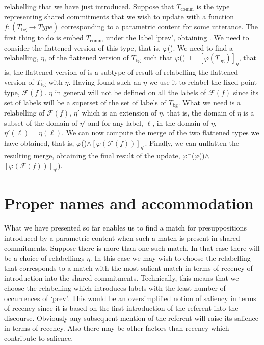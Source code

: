 relabelling that we have just introduced.  Suppose that $T_{\mathrm{comm}}$ is the
type representing shared commitments that we wish to update with a
function $f:(T_{\mathrm{bg}}\rightarrow\textit{Type})$ corresponding
to a parametric content for some utterance.  The
first thing to do is embed  $T_{\mathrm{comm}}$ under the label `prev', obtaining
.  We need to
consider the flattened version of this type, that is,
$\varphi$(). We
need to find a relabelling, $\eta$, of the flattened version of
$T_{\mathrm{bg}}$ such that
$\varphi$()
$\sqsubseteq$ $[\varphi(T_{\mathrm{bg}})]_\eta$, that is, the
flattened version of
 is a subtype of
result of relabelling the flattened version of $T_{\mathrm{bg}}$ with
$\eta$.  Having found such an $\eta$ we use it to relabel the fixed
point type, $\mathcal{F}(f)$.  $\eta$ in general will not be defined
on all the labels of $\mathcal{F}(f)$ since its set of labels will be
a superset of the set of labels of $T_{\mathrm{bg}}$.  What we need is
a relabelling of $\mathcal{F}(f)$, $\eta'$ which is an extension of
$\eta$, that is, the domain of $\eta$ is a subset of the domain of
$\eta'$ and  for any label, $\ell$, in the domain of $\eta$,
$\eta'(\ell)=\eta(\ell)$.\label{pg:etaprime}  We can now compute the merge of the two
flattened types we have obtained, that is,
$\varphi$()\d{$\wedge$}$[\varphi(\mathcal{F}(f))]_{\eta'}$.
Finally, we can unflatten the resulting merge, obtaining the final
result of the update,
$\varphi^-$($\varphi$()\d{$\wedge$}$[\varphi(\mathcal{F}(f))]_{\eta'}$).

\section{Proper names and accommodation}

What we have presented so far enables us to find a match for
presuppositions introduced by a parametric content when such a match
is present in shared commitments.  Suppose there is more than one such
match.  In that case there will be a choice of relabellings $\eta$.
In this case we may wish to choose the relabelling that corresponds to
a match with the most salient match in terms of recency of
introduction into the shared commitments.  Technically, this means
that we choose the relabelling which introduces labels with the least
number of occurrences of `prev'.  This would be an oversimplified
notion of saliency in terms of recency since it is based on the first
introduction of the referent into the discourse.  Obviously any
subsequent mention of the referent will raise its salience in terms of
recency.  Also there may be other factors than recency which
contribute to salience.

